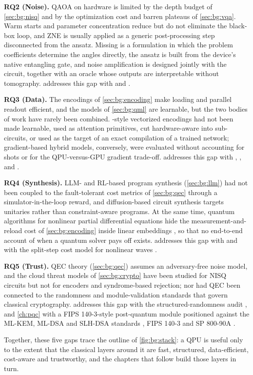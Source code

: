 \textbf{RQ2 (Noise).} QAOA on hardware is limited by the depth budget of \cref{sec:bg:nisq} and by the optimization cost and barren plateaus of \cref{sec:bg:vqa}. Warm starts and parameter concentration reduce but do not eliminate the black-box loop, and ZNE is usually applied as a generic post-processing step disconnected from the ansatz. Missing is a formulation in which the problem coefficients determine the angles directly, the ansatz is built from the device's native entangling gate, and noise amplification is designed jointly with the circuit, together with an oracle whose outputs are interpretable without tomography.  addresses this gap with \deal{} \cite{guo2025deal} and \qawa{} \cite{guo2025qawa}.

\textbf{RQ3 (Data).} The encodings of \cref{sec:bg:encoding} make loading and parallel readout efficient, and the models of \cref{sec:bg:qml} are learnable, but the two bodies of work have rarely been combined. \qcrank{}-style vectorized encodings had not been made learnable, used as attention primitives, cut hardware-aware into sub-circuits, or used as the target of an exact compilation of a trained network; gradient-based hybrid models, conversely, were evaluated without accounting for shots or for the QPU-versus-GPU gradient trade-off.  addresses this gap with \qpie{} \cite{guo2025qpie}, \vqt{} \cite{guo2025vqt}, \shardq{} \cite{guo2025shardq} and \nnqa{} \cite{guo2026nnqa}.

\textbf{RQ4 (Synthesis).} LLM- and RL-based program synthesis (\cref{sec:bg:llm}) had not been coupled to the fault-tolerant cost metrics of \cref{sec:bg:qec} through a simulator-in-the-loop reward, and diffusion-based circuit synthesis targets unitaries rather than constraint-aware programs. At the same time, quantum algorithms for nonlinear partial differential equations hide the measurement-and-reload cost of \cref{sec:bg:encoding} inside linear embeddings \cite{jin2024schrodingerization}, so that no end-to-end account of when a quantum solver pays off exists.  addresses this gap with \rubriq{} \cite{guo2026rubriq,guo2026rubriqsoftware} and with the split-step cost model for nonlinear waves \cite{guo2026nonlinearwaves,guo2026splitstepqude}.

\textbf{RQ5 (Trust).} QEC theory (\cref{sec:bg:qec}) assumes an adversary-free noise model, and the cloud threat models of \cref{sec:bg:crypto} have been studied for NISQ circuits but not for encoders and syndrome-based rejection; nor had QEC been connected to the randomness and module-validation standards that govern classical cryptography.  addresses this gap with the structured-randomness audit \cite{guo2026qecaudit}, and \cref{ch:pqc} with a FIPS 140-3-style post-quantum module \cite{guo2026lightriderqpc} positioned against the ML-KEM, ML-DSA and SLH-DSA standards \cite{nist2024fips203,nist2024fips204,nist2024fips205}, FIPS 140-3 \cite{nist2019fips1403} and SP 800-90A \cite{nist2015sp80090a}.

Together, these five gaps trace the outline of \cref{fig:bg:stack}: a QPU is useful only to the extent that the classical layers around it are fast, structured, data-efficient, cost-aware and trustworthy, and the chapters that follow build those layers in turn.
